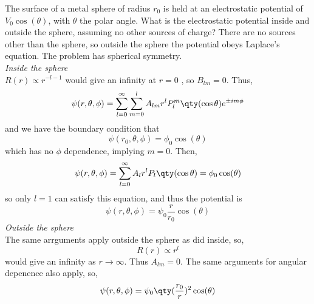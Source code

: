 \begin{example}
  The surface of a metal sphere of radius $r_0$ is held at an
  electrostatic potential of $V_0 \cos(\theta)$, with $\theta$ the
  polar angle. What is the electrostatic potential inside and outside
  the sphere, assuming no other sources of charge?
  There are no sources other than the sphere, so outside the sphere
  the potential obeys Laplace's equation. The problem has spherical
  symmetry.\\
  {\em Inside the sphere}\\
  $R(r) \propto r^{-l-1}$ would give an infinity at $r=0$ , so
  $B_{lm}=0$.  Thus,
  \[
  \psi(r, \theta, \phi) = \sum_{l=0}^{\infty} \sum_{m=0}^l A_{lm}r^l
  P_l^m \qty( \cos \theta) e^{\pm i m \phi}
  \]
  and we have the boundary condition that
  \[ \psi(r_0, \theta, \phi) = \phi_0 \cos(\theta) \] which has no
  $\phi$ dependence, implying $m=0$.  Then,
  \[ \psi(r, \theta, \phi) = \sum_{l=0}^{\infty} A_{l}r^l P_l \qty(
  \cos \theta) = \phi_0 \cos(\theta) \] so only $l=1$ can satisfy this
  equation, and thus the potential is
  \begin{equation*}
    \psi(r, \theta, \phi) = \psi_0 \frac{r}{r_0} \cos(\theta)
  \end{equation*}
  {\em Outside the sphere}\\
  The same arrguments apply outside the sphere as did inside, so,
  \[ R(r) \propto r^l \] would give an infinity as $r \to
  \infty$. Thus $A_{lm}=0$. The same arguments for angular depenence
  also apply, so,
  \begin{equation*}
    \psi(r, \theta, \phi) = \psi_0 \qty( \frac{r_0}{r})^2 \cos(\theta)
  \end{equation*}
\end{example}

